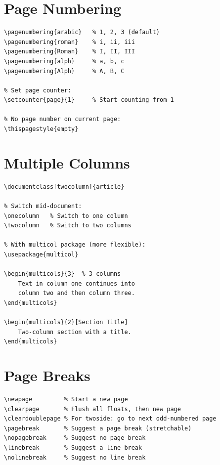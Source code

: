 \section{Page Numbering}

\begin{lstlisting}[language={[LaTeX]TeX}, caption=Page numbering]
% Numbering styles:
\pagenumbering{arabic}   % 1, 2, 3 (default)
\pagenumbering{roman}    % i, ii, iii
\pagenumbering{Roman}    % I, II, III
\pagenumbering{alph}     % a, b, c
\pagenumbering{Alph}     % A, B, C

% Set page counter:
\setcounter{page}{1}     % Start counting from 1

% No page number on current page:
\thispagestyle{empty}
\end{lstlisting}

\section{Multiple Columns}

\begin{lstlisting}[language={[LaTeX]TeX}, caption=Multiple columns]
% Document-wide twocolumn option:
\documentclass[twocolumn]{article}

% Switch mid-document:
\onecolumn   % Switch to one column
\twocolumn   % Switch to two columns

% With multicol package (more flexible):
\usepackage{multicol}

\begin{multicols}{3}  % 3 columns
    Text in column one continues into
    column two and then column three.
\end{multicols}

\begin{multicols}{2}[Section Title]
    Two-column section with a title.
\end{multicols}
\end{lstlisting}

\section{Page Breaks}

\begin{lstlisting}[language={[LaTeX]TeX}, caption=Page breaks]
\newpage         % Start a new page
\clearpage       % Flush all floats, then new page
\cleardoublepage % For twoside: go to next odd-numbered page
\pagebreak       % Suggest a page break (stretchable)
\nopagebreak     % Suggest no page break
\linebreak       % Suggest a line break
\nolinebreak     % Suggest no line break
\end{lstlisting}

